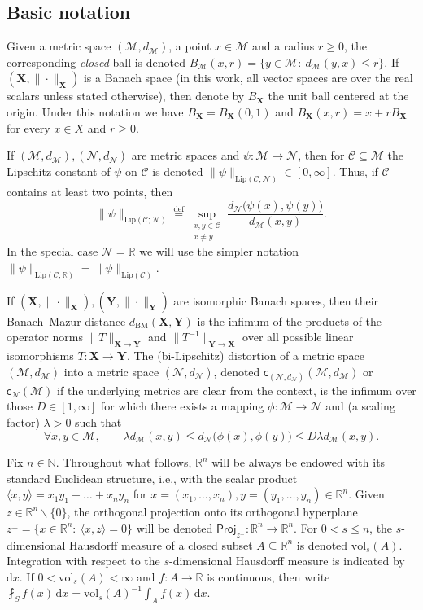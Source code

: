 \documentclass[11pt,reqno]{amsart}
\renewcommand{\le}{\leqslant}
\renewcommand{\ge}{\geqslant}
\renewcommand{\setminus}{\smallsetminus}
\newcommand{\ud}[0]{\,\mathrm{d}}
\newcommand{\cc}{\mathsf{c}}
\newcommand{\NN}{\mathcal{N}}
\newcommand{\proj}{\mathsf{Proj}}
\newcommand{\X}{\mathbf X}
\newcommand{\Y}{\mathbf Y}
\newcommand{\R}{\mathbb R}
\theoremstyle{remark}
\newcommand{\MM}{\mathcal{M}}
\renewcommand{\subset}{\subseteq}
\newcommand{\N}{\mathbb N}
\newcommand{\eqdef}{\stackrel{\mathrm{def}}{=}}
\newcommand{\Lip}{\mathrm{Lip}}
\newcommand{\BM}{\mathrm{BM}}
\newcommand{\sub}{\mathscr{C}}
\newcommand{\vol}{\mathrm{vol}}
\renewcommand{\1}{\mathbf 1}
\begin{document}
\subsection{Basic notation}\label{sec:basic defs}


Given a metric space $(\MM,d_\MM)$, a point $x\in \MM$ and a radius $r\ge 0$, the corresponding {\em closed} ball is denoted $B_\MM(x,r)=\{y\in \MM:\ d_\MM(y,x)\le r\}$. If $(\X,\|\cdot\|_{\X})$ is a Banach space (in this work, all  vector spaces are over the real scalars unless stated otherwise), then  denote by $B_{\X}$ the unit ball centered at the origin. Under this notation we have  $B_{\X}=B_{\X}(0,1)$ and $B_{\X}(x,r)=x+rB_{\X}$ for every $x\in X$ and $r\ge 0$. %

If $(\MM,d_\MM), (\NN,d_\NN)$ are metric spaces and $\psi:\MM\to \NN$, then for $\sub\subset \MM$ the Lipschitz constant of $\psi$ on $\sub$ is denoted $\|\psi\|_{\Lip(\sub;\NN)}\in [0,\infty]$. Thus, if $\sub$ contains at least two points, then
$$
\|\psi\|_{\Lip(\sub;\NN)}\eqdef\sup_{\substack{x,y\in \sub\\ x\neq y}}\frac{d_\NN\big(\psi(x),\psi(y)\big)}{d_\MM(x,y)}.
$$
In the special case $\NN=\R$ we will use the simpler notation $\|\psi\|_{\Lip(\sub;\R)}=\|\psi\|_{\Lip(\sub)}$.

If $(\X,\|\cdot\|_{\X}), (\Y,\|\cdot\|_{\Y})$ are isomorphic Banach spaces, then their Banach--Mazur distance $d_{\BM}(\X,\Y)$ is the infimum of the products of the operator norms $\|T\|_{\X\to \Y}$ and $\|T^{-1}\|_{\Y\to \X}$ over all possible linear isomorphisms $T:\X\to \Y$. The (bi-Lipschitz) distortion of  a metric space $(\MM,d_\MM)$ into a metric space $(\NN,d_\NN)$, denoted $\cc_{(\NN,d_\NN)}(\MM,d_\MM)$ or  $\cc_{\NN}(\MM)$ if the underlying metrics are clear from the context, is the infimum over those $D\in [1,\infty]$ for which there exists a mapping $\phi:\MM\to \NN$ and (a scaling factor) $\lambda>0$ such that
\begin{equation}\label{eq:def distortion}
\forall  x,y\in \MM,\qquad \lambda d_\MM(x,y)\le d_\NN\big(\phi(x),\phi(y)\big)\le D\lambda d_\MM(x,y).
\end{equation}

Fix $n\in \N$. Throughout what follows, $\R^n$ will be always be endowed with its standard Euclidean structure, i.e., with the scalar product  $\langle x,y\rangle=x_1y_1+\ldots+x_ny_n$ for $x=(x_1,\ldots,x_n),y=(y_1,\ldots,y_n)\in \R^n$.   Given $z\in \R^n\setminus\{0\}$, the orthogonal projection onto its orthogonal hyperplane $z^\perp=\{x\in \R^n:\ \langle x,z\rangle= 0\}$ will be denoted $\proj_{z^\perp}: \R^n\to \R^n$. For $0<s\le n$, the $s$-dimensional Hausdorff measure of a closed subset $A\subset \R^n$ is denoted $\vol_s(A)$. Integration with respect to the $s$-dimensional Hausdorff measure is indicated by $\mathrm{d} x$. If $0<\vol_s(A)<\infty$ and $f:A\to \R$ is continuous, then write $
\fint_S f(x)\ud x=\vol_s(A)^{-1}\int_A f(x)\ud x.$
\end{document}
